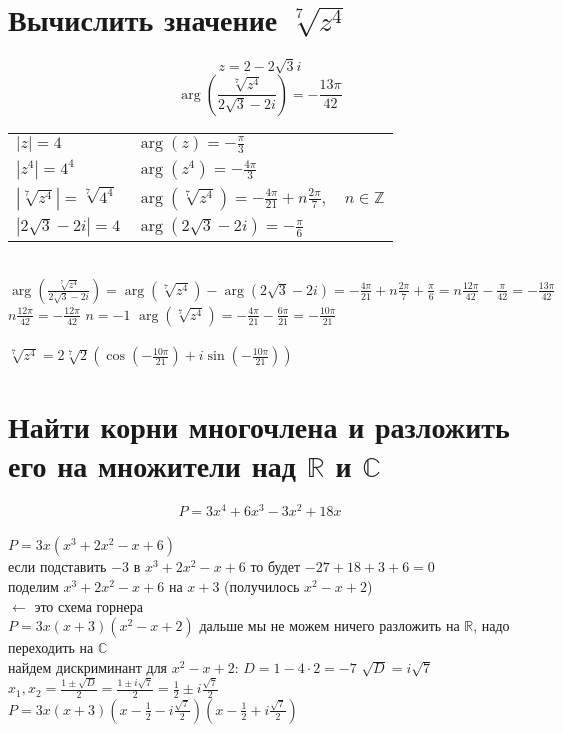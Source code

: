 \documentclass{article}
\newcommand{\ds}{\displaystyle}
\newcommand{\abs}[1]{\left|#1\right|}
\newcommand{\Arg}[1]{\arg\left(#1\right)}
\newcommand{\TrigFrom}[1]{
  \left(\cos\left({#1}\right)+i\sin\left({#1}\right)\right)
}
\begin{document}
  \section{Вычислить значение $\sqrt[7]{z^4}$}
  $$ z = 2 - 2\sqrt{3}i $$
  $$ \Arg{ \frac{\sqrt[7]{z^4}}{2\sqrt{3} - 2i} } = -\frac{13\pi}{42} $$
  \begin{tabular}{ll}
    $\ds \abs{z} = 4$ & $\ds \Arg z = -\frac{\pi}{3}$ \\
    $\ds \abs{z^4} = 4^4$ & $\ds \Arg{z^4} = -\frac{4\pi}{3}$ \\
    $\ds \abs{\sqrt[7]{z^4}} = \sqrt[7]{4^4}$ & $\ds \Arg{\sqrt[7]{z^4}} = -\frac{4\pi}{21} + n\frac{2\pi}{7},\quad n\in\mathbb{Z}$ \\
    $\ds \abs{2\sqrt{3} - 2i} = 4$ & $\ds \Arg{2\sqrt{3} - 2i} = -\frac{\pi}{6}$
  \end{tabular} \\
  $\ds \Arg{ \frac{\sqrt[7]{z^4}}{2\sqrt{3} - 2i} }
    = \Arg{\sqrt[7]{z^4}} - \Arg{2\sqrt{3} - 2i}
    = -\frac{4\pi}{21} + n\frac{2\pi}{7} + \frac{\pi}{6}
    = n\frac{12\pi}{42} - \frac{\pi}{42}
    = -\frac{13\pi}{42}
  $ \\
  $\ds n\frac{12\pi}{42} = -\frac{12\pi}{42}$ \quad $n = -1$ \quad
  $\ds \Arg{\sqrt[7]{z^4}} = -\frac{4\pi}{21} - \frac{6\pi}{21} = -\frac{10\pi}{21}$ \\ \\
  $\ds \sqrt[7]{z^4} = 2\sqrt[7]{2} \TrigFrom{-\frac{10\pi}{21}}$

  \section{Найти корни многочлена и разложить его на множители над $\mathbb{R}$ и $\mathbb{C}$}
  \[
    P = 3x^4 + 6x^3 - 3x^2 + 18x
  \] \\
  $\ds P = 3x(x^3 + 2x^2 - x + 6)$ \\
  если подставить $-3$ в $x^3 + 2x^2 - x + 6$ то будет $-27 + 18 + 3 + 6 = 0$ \\
  поделим $x^3 + 2x^2 - x + 6$ на $x+3$ (получилось $x^2-x+2$) \\
   \qquad $\leftarrow$ это схема горнера\\
  $\ds P = 3x(x+3)(x^2-x+2)$ дальше мы не можем ничего разложить на $\mathbb{R}$, надо переходить на $\mathbb{C}$ \\
  найдем дискриминант для $x^2-x+2$: \quad $\ds D = 1-4 \cdot 2 = -7$ \quad $\sqrt{D} = i\sqrt{7}$ \\
  $\ds x_1,x_2 = \frac{1\pm\sqrt{D}}{2} = \frac{1\pm i\sqrt{7}}{2} = \frac{1}{2}\pm i\frac{\sqrt{7}}{2}$ \\
  $\ds P = 3x(x+3)
    \left(x-\frac{1}{2}-i\frac{\sqrt{7}}{2}\right)
    \left(x-\frac{1}{2}+i\frac{\sqrt{7}}{2}\right)
  $
\end{document}
